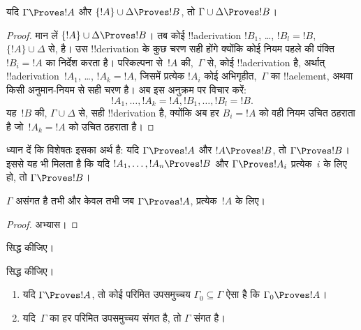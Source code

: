 \documentclass[../../../include/open-logic-section]{subfiles}
\begin{document}
\begin{prop}[संक्रामकता]
यदि $\Gamma \Proves !A$ और $\{!A\} \cup \Delta \Proves
!B$, तो $\Gamma \cup \Delta \Proves !B$।
\end{prop}

\begin{proof}
  मान लें $\{!A\} \cup \Delta \Proves !B$। तब कोई !!a{derivation}
  $!B_1$, \dots, $!B_l = !B$,~$\{!A\} \cup
  \Delta$ से, है। उस
  !!{derivation} के कुछ चरण सही होंगे क्योंकि कोई नियम पहले की
  पंक्ति~$!B_i = !A$ का निर्देश करता है। परिकल्पना से~$!A$ की,~$\Gamma$ से,
  कोई !!a{derivation} है, अर्थात् !!a{derivation}~$!A_1$, \dots,
  $!A_k = !A$, जिसमें प्रत्येक $!A_i$ कोई अभिगृहीत,~$\Gamma$ का
  !!a{element}, अथवा
  किसी अनुमान-नियम से सही चरण है। अब इस अनुक्रम पर विचार करें:
  \[
  !A_1, \dots, !A_k = !A, !B_1, \dots, !B_l = !B.
  \]
  यह~$!B$ की, $\Gamma \cup \Delta$ से, सही !!{derivation} है, क्योंकि अब हर
  $B_i = !A$ को वही नियम उचित ठहराता है जो~$!A_k = !A$ को उचित ठहराता है।
\end{proof}

ध्यान दें कि विशेषतः इसका अर्थ है: यदि $\Gamma \Proves !A$ और $!A
\Proves !B$, तो $\Gamma \Proves !B$। इससे यह भी मिलता है कि यदि $!A_1,
\dots, !A_n \Proves !B$ और $\Gamma \Proves !A_i$ प्रत्येक~$i$ के लिए हो,
तो $\Gamma \Proves !B$।

\begin{prop}
$\Gamma$ असंगत है तभी और केवल तभी जब $\Gamma \Proves !A$, प्रत्येक~$!A$
के लिए।
\end{prop}

\begin{proof}
अभ्यास।
\end{proof}

\begin{prob}
 सिद्ध कीजिए।
\end{prob}
\tagendprob

\begin{prob}
 सिद्ध कीजिए।
\end{prob}
\tagendprob

\begin{prop}[संहतता]
  \begin{enumerate}
  \item यदि $\Gamma \Proves !A$, तो कोई परिमित उपसमुच्चय $\Gamma_0
    \subseteq \Gamma$ ऐसा है कि $\Gamma_0 \Proves !A$।
  \item यदि~$\Gamma$ का हर परिमित उपसमुच्चय संगत है, तो $\Gamma$ संगत है।
  \end{enumerate}
\end{prop}
\end{document}

